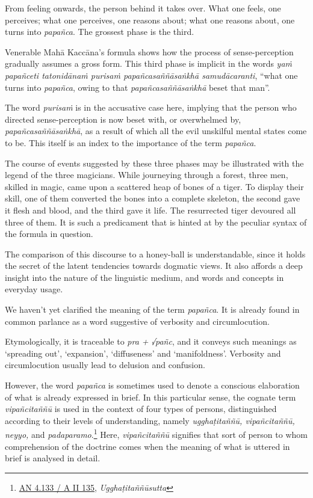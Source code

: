 From feeling onwards, the person behind it takes over. What one feels, one perceives; what one perceives, one reasons about; what one reasons about, one turns into \emph{papañca}. The grossest phase is the third.

Venerable Mahā Kaccāna's formula shows how the process of sense-perception gradually assumes a gross form. This third phase is implicit in the words \emph{yaṁ papañceti tatonidānaṁ purisaṁ papañcasaññāsaṅkhā samudācaranti}, ``what one turns into \emph{papañca}, owing to that \emph{papañcasaññāsaṅkhā} beset that man''.

The word \emph{purisaṁ} is in the accusative case here, implying that the person who directed sense-perception is now beset with, or overwhelmed by, \emph{papañcasaññāsaṅkhā}, as a result of which all the evil unskilful mental states come to be. This itself is an index to the importance of the term \emph{papañca}.

The course of events suggested by these three phases may be illustrated with the legend of the three magicians. While journeying through a forest, three men, skilled in magic, came upon a scattered heap of bones of a tiger. To display their skill, one of them converted the bones into a complete skeleton, the second gave it flesh and blood, and the third gave it life. The resurrected tiger devoured all three of them. It is such a predicament that is hinted at by the peculiar syntax of the formula in question.

The comparison of this discourse to a honey-ball is understandable, since it holds the secret of the latent tendencies towards dogmatic views. It also affords a deep insight into the nature of the linguistic medium, and words and concepts in everyday usage.

We haven't yet clarified the meaning of the term \emph{papañca}. It is already found in common parlance as a word suggestive of verbosity and circumlocution.

Etymologically, it is traceable to \emph{pra + √pañc}, and it conveys such meanings as `spreading out', `expansion', `diffuseness' and `manifoldness'. Verbosity and circumlocution usually lead to delusion and confusion.

However, the word \emph{papañca} is sometimes used to denote a conscious elaboration of what is already expressed in brief. In this particular sense, the cognate term \emph{vipañcitaññū} is used in the context of four types of persons, distinguished according to their levels of understanding, namely \emph{ugghaṭitaññū, vipañcitaññū, neyyo,} and \emph{padaparamo}.\footnote{\href{https://suttacentral.net/an4.133/pli/ms}{AN 4.133 / A II 135}, \emph{Ugghaṭitaññūsutta}} Here, \emph{vipañcitaññū} signifies that sort of person to whom comprehension of the doctrine comes when the meaning of what is uttered in brief is analysed in detail.

